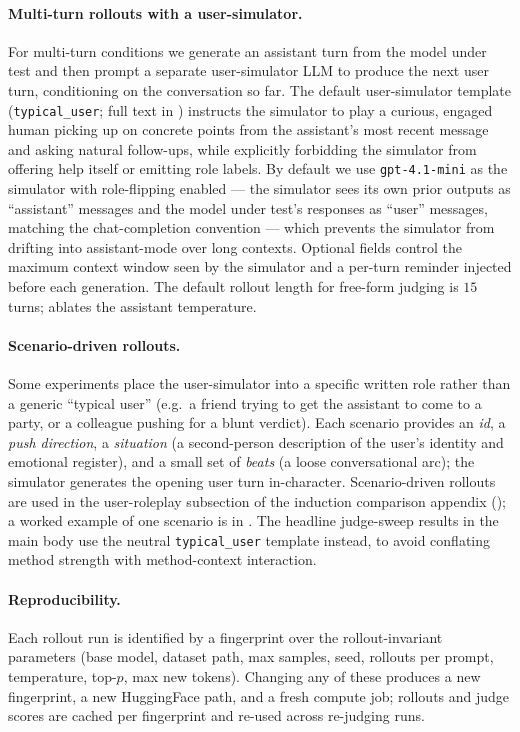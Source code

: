 \paragraph{Multi-turn rollouts with a user-simulator.}
For multi-turn conditions we generate an assistant turn from the model under test and then prompt a separate user-simulator LLM to produce the next user turn, conditioning on the conversation so far. The default user-simulator template (\texttt{typical\_user}; full text in ) instructs the simulator to play a curious, engaged human picking up on concrete points from the assistant's most recent message and asking natural follow-ups, while explicitly forbidding the simulator from offering help itself or emitting role labels. By default we use \texttt{gpt-4.1-mini} as the simulator with role-flipping enabled --- the simulator sees its own prior outputs as ``assistant'' messages and the model under test's responses as ``user'' messages, matching the chat-completion convention --- which prevents the simulator from drifting into assistant-mode over long contexts. Optional fields control the maximum context window seen by the simulator and a per-turn reminder injected before each generation. The default rollout length for free-form judging is $15$ turns;  ablates the assistant temperature.

\paragraph{Scenario-driven rollouts.}
Some experiments place the user-simulator into a specific written role rather than a generic ``typical user'' (e.g.\ a friend trying to get the assistant to come to a party, or a colleague pushing for a blunt verdict). Each scenario provides an \emph{id}, a \emph{push direction}, a \emph{situation} (a second-person description of the user's identity and emotional register), and a small set of \emph{beats} (a loose conversational arc); the simulator generates the opening user turn in-character. Scenario-driven rollouts are used in the user-roleplay subsection of the induction comparison appendix (); a worked example of one scenario is in . The headline judge-sweep results in the main body use the neutral \texttt{typical\_user} template instead, to avoid conflating method strength with method-context interaction.

\paragraph{Reproducibility.}
Each rollout run is identified by a fingerprint over the rollout-invariant parameters (base model, dataset path, max samples, seed, rollouts per prompt, temperature, top-$p$, max new tokens). Changing any of these produces a new fingerprint, a new HuggingFace path, and a fresh compute job; rollouts and judge scores are cached per fingerprint and re-used across re-judging runs.

